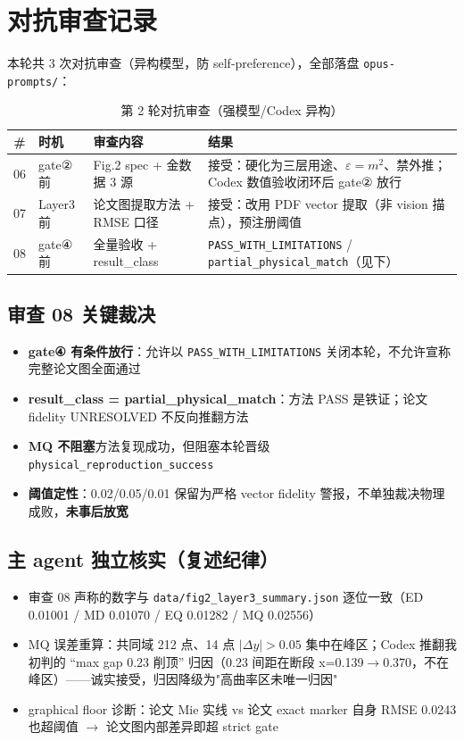 \section{对抗审查记录}

本轮共 3 次对抗审查（异构模型，防 self-preference），全部落盘 \texttt{opus-prompts/}：

\begin{table}[H]
\centering
\small
\begin{tabular}{clll}
\toprule
\# & 时机 & 审查内容 & 结果 \\
\midrule
06 & gate② 前 & Fig.2 spec + 金数据 3 源 & 接受：硬化为三层用途、$\varepsilon=m^2$、禁外推；Codex 数值验收闭环后 gate② 放行 \\
07 & Layer3 前 & 论文图提取方法 + RMSE 口径 & 接受：改用 PDF vector 提取（非 vision 描点），预注册阈值 \\
08 & gate④ 前 & 全量验收 + result\_class & \texttt{PASS\_WITH\_LIMITATIONS} / \texttt{partial\_physical\_match}（见下） \\
\bottomrule
\end{tabular}
\caption{第 2 轮对抗审查（强模型/Codex 异构）}
\end{table}

\subsection{审查 08 关键裁决}

\begin{itemize}
  \item \textbf{gate④ 有条件放行}：允许以 \texttt{PASS\_WITH\_LIMITATIONS} 关闭本轮，不允许宣称完整论文图全面通过
  \item \textbf{result\_class = partial\_physical\_match}：方法 PASS 是铁证；论文 fidelity UNRESOLVED 不反向推翻方法
  \item \textbf{MQ 不阻塞}方法复现成功，但阻塞本轮晋级 \texttt{physical\_reproduction\_success}
  \item \textbf{阈值定性}：0.02/0.05/0.01 保留为严格 vector fidelity 警报，不单独裁决物理成败，\textbf{未事后放宽}
\end{itemize}

\subsection{主 agent 独立核实（复述纪律）}

\begin{itemize}
  \item 审查 08 声称的数字与 \texttt{data/fig2\_layer3\_summary.json} 逐位一致（ED 0.01001 / MD 0.01070 / EQ 0.01282 / MQ 0.02556）
  \item MQ 误差重算：共同域 212 点、14 点 $|\Delta y|>0.05$ 集中在峰区；Codex 推翻我初判的 ``max gap 0.23 削顶'' 归因（0.23 间距在断段 x=0.139$\to$0.370，不在峰区）——诚实接受，归因降级为"高曲率区未唯一归因"
  \item graphical floor 诊断：论文 Mie 实线 vs 论文 exact marker 自身 RMSE 0.0243 也超阈值 $\rightarrow$ 论文图内部差异即超 strict gate
\end{itemize}
